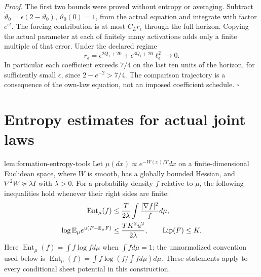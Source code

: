 \emph{Proof.}
The first two bounds were proved without entropy or averaging.
Subtract $\dot\vartheta_0=\epsilon(2-\vartheta_0)$,
$\vartheta_0(0)=1$, from the actual equation and integrate with factor
$e^{\epsilon t}$. The forcing contribution is at most $C_Lr_\epsilon$
through the full horizon. Copying the actual parameter at each of
finitely many activations adds only a finite multiple of that error.
Under the declared regime
\begin{equation}
 r_\epsilon
 =\epsilon^{2Q_1+20}
   +\epsilon^{3Q_1+26}\ell_\epsilon^2\longrightarrow0.
 \label{eq:rg-formation-small-parameter-remainder}
\end{equation}
In particular each coefficient exceeds $7/4$ on the last ten units of
the horizon, for sufficiently small $\epsilon$, since
$2-e^{-2}>7/4$. The comparison trajectory is a consequence of the
own-law equation, not an imposed coefficient schedule.
\hfill$\square$

\section{Entropy estimates for actual joint laws}
\label{sec:rg-formation-entropy-proof}

{lem:formation-entropy-tools}
Let $\mu(dx)\propto e^{-W(x)/T}dx$ on a finite-dimensional Euclidean
space, where $W$ is smooth, has a globally bounded Hessian, and
$\nabla^2W\succeq\lambda I$ with $\lambda>0$. For a probability density
$f$ relative to $\mu$, the following inequalities hold whenever their
right sides are finite:
\begin{align}
 \operatorname{Ent}_\mu(f)
 &\le \frac{T}{2\lambda}
           \int\frac{|\nabla f|^2}{f}d\mu,
 \label{eq:rg-formation-continuous-lsi}\\
 \log\mathbb E_\mu e^{u(F-\mathbb E_\mu F)}
 &\le\frac{T K^2u^2}{2\lambda},
 \qquad \operatorname{Lip}(F)\le K.
 \label{eq:rg-formation-herbst-proof}
\end{align}
Here $\operatorname{Ent}_\mu(f)=\int f\log f d\mu$ when $\int f d\mu=1$;
the unnormalized convention used below is
$\operatorname{Ent}_\mu(f)=\int f\log(f/\int f d\mu)d\mu$.
These statements apply to every conditional sheet potential in this
construction. 

